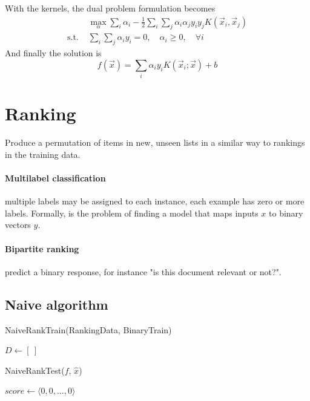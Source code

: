 \documentclass[a4paper,6pt,twocolumn,fleqn]{article}
\begin{document}
With the kernels, the dual problem formulation becomes
\begin{align*}
    &\max_\alpha \sum_i \alpha_i - \frac 1 2 \sum_i \sum_j \alpha_i \alpha_j y_i y_j K(\vec{x}_i, \vec{x}_j)\\
    \text{s.t. } &\sum_i \sum_j \alpha_i y_i = 0, \quad \alpha_i \geq 0, \quad \forall i
\end{align*}
And finally the solution is
\begin{equation}
    f(\vec{x}) = \sum_i \alpha_i y_i K(\vec{x}_i; \vec{x}) + b
\end{equation}

\section{Ranking}
Produce a permutation of items in new, unseen lists in a similar way to rankings in the training data.

\paragraph{Multilabel classification} multiple labels may be assigned to each instance, each example has zero or more labels. Formally, is the problem of finding a model that maps inputs \(x\) to binary vectors \(y\).

\paragraph{Bipartite ranking} predict a binary response, for instance "is this document relevant or not?".

\subsection{Naive algorithm} %
\begin{algorithm}
    \caption{NaiveRankTrain(RankingData, BinaryTrain)}
    \label{alg:naive_rank_train}
    $D \gets [\ ]$\;
\end{algorithm}

\begin{algorithm}
    \caption{NaiveRankTest($f$, $\hat{x}$)}
    \label{alg:naive_rank_test}
$score \gets \langle 0, 0, ..., 0 \rangle$\;
\end{algorithm}
\end{document}
